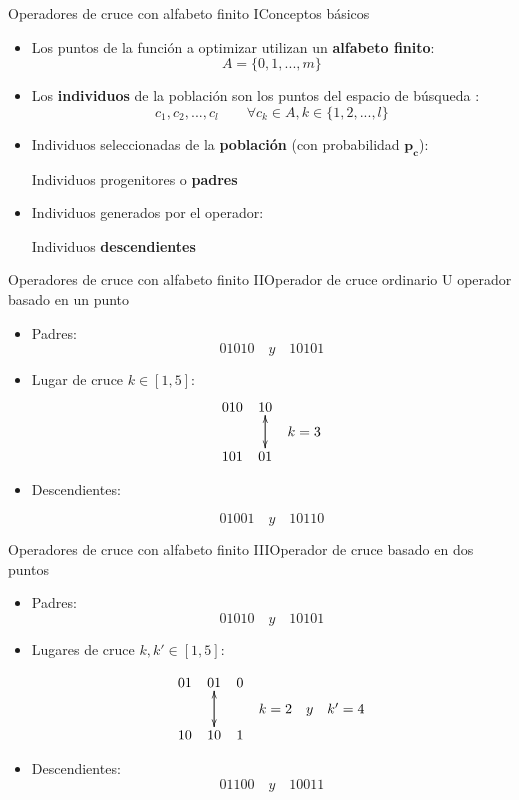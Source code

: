 \documentclass[10pt]{beamer}
\begin{document}
\begin{frame}{Operadores de cruce con alfabeto finito I}{Conceptos básicos}
	\begin{itemize}
		\item Los puntos de la función a optimizar utilizan un \textbf{alfabeto finito}: 
			$$ A = \{0, 1, ..., m\} $$
		\item Los \textbf{individuos} de la población son los puntos del espacio de búsqueda :
			$$ c_1, c_2, ..., c_l \quad\quad \forall c_k \in A, k \in \{1, 2, ..., l\} $$
		\item Individuos seleccionadas de la \textbf{población} (con probabilidad $\boldsymbol{p_c}$): \\
			\begin{center}
				Individuos progenitores o \textbf{padres}
			\end{center}
		\item Individuos generados por el operador: \\
			\begin{center}
				Individuos \textbf{descendientes}
			\end{center}
	\end{itemize}
\end{frame}

\begin{frame}{Operadores de cruce con alfabeto finito II}{Operador de cruce ordinario U operador basado en un punto}
	
	\begin{itemize}
		\item Padres:
			$$ 01010 \quad y \quad 10101 $$
		
		\item Lugar de cruce $ k \in [1, 5]  $:
				$$\xymatrix@=5pt{
					 010  &  10 \ar[dd] & \\
					  & & k = 3 \\
					 101  &  01  \ar[uu] &\\
				} $$
		\item Descendientes:
		
			$$ 01001 \quad y \quad 10110 $$
	\end{itemize}
	\end{frame}

\begin{frame}{Operadores de cruce con alfabeto finito III}{Operador de cruce basado en dos puntos}
		\begin{itemize}
			\item Padres:
			$$ 01010 \quad y \quad 10101 $$
			
			\item Lugares de cruce $ k, k' \in [1, 5] $:

				$$\xymatrix@=5pt{
					01 & 01 \ar[dd]  &  0  & \\
					& & & k = 2 \quad y \quad k' = 4 \\
					10 & 10 \ar[uu] & 1   &\\
				} $$
			
			\item Descendientes:
				$$ 01100 \quad y \quad 10011 $$
		\end{itemize}
\end{frame}
\end{document}
